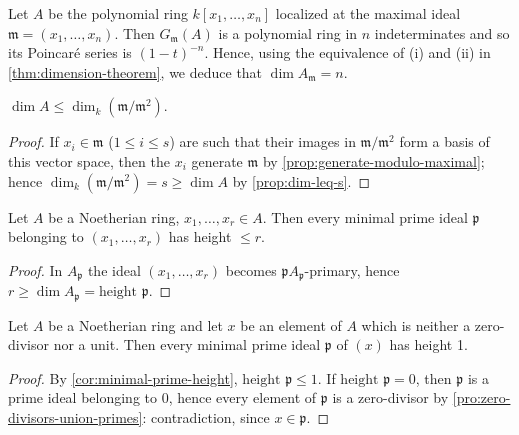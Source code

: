 \begin{example}
Let $A$ be the polynomial ring $k[x_1, \ldots, x_n]$ localized at the maximal ideal $\mathfrak{m} = (x_1, \ldots, x_n)$. Then $G_{\mathfrak{m}}(A)$ is a polynomial ring in $n$ indeterminates and so its Poincar\'e series is $(1 - t)^{-n}$. Hence, using the equivalence of (i) and (ii) in \ref{thm:dimension-theorem}, we deduce that $\dim A_{\mathfrak{m}} = n$.
\end{example}

\begin{corollary}\label{cor:dim-leq-embedding}
$\dim A \leq \dim_k(\mathfrak{m}/\mathfrak{m}^2)$.
\end{corollary}

\begin{proof}
If $x_i \in \mathfrak{m}$ ($1 \leq i \leq s$) are such that their images in $\mathfrak{m}/\mathfrak{m}^2$ form a basis of this vector space, then the $x_i$ generate $\mathfrak{m}$ by \eqref{prop:generate-modulo-maximal}; hence $\dim_k(\mathfrak{m}/\mathfrak{m}^2) = s \geq \dim A$ by \eqref{prop:dim-leq-s}.
\end{proof}

\begin{corollary}\label{cor:minimal-prime-height}
Let $A$ be a Noetherian ring, $x_1, \ldots, x_r \in A$. Then every minimal prime ideal $\mathfrak{p}$ belonging to $(x_1, \ldots, x_r)$ has height $\leq r$.
\end{corollary}

\begin{proof}
In $A_{\mathfrak{p}}$ the ideal $(x_1, \ldots, x_r)$ becomes $\mathfrak{p}A_{\mathfrak{p}}$-primary, hence $r \geq \dim A_{\mathfrak{p}} = \text{height } \mathfrak{p}$.
\end{proof}

\begin{corollary}\label{cor:principal-ideal}
Let $A$ be a Noetherian ring and let $x$ be an element of $A$ which is neither a zero-divisor nor a unit. Then every minimal prime ideal $\mathfrak{p}$ of $(x)$ has height 1.
\end{corollary}

\begin{proof}
By \eqref{cor:minimal-prime-height}, $\text{height } \mathfrak{p} \leq 1$. If $\text{height } \mathfrak{p} = 0$, then $\mathfrak{p}$ is a prime ideal belonging to 0, hence every element of $\mathfrak{p}$ is a zero-divisor by \eqref{pro:zero-divisors-union-primes}: contradiction, since $x \in \mathfrak{p}$.
\end{proof}

